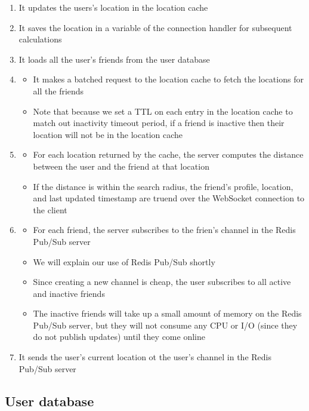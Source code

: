 \documentclass{report}
\theoremstyle{definition}
\let\oldsubsection\subsection
\renewcommand{\subsection}{\oldsubsection*}
\begin{document}
\begin{enumerate}
\item
It updates the users's location in the location cache
\item
It saves the location in a variable of the connection handler for subsequent calculations
\item
It loads all the user's friends from the user database
\item

\begin{itemize}
\item
It makes a batched request to the location cache to fetch the locations for all the friends
\item
Note that because we set a TTL on each entry in the location cache to match out inactivity timeout period, if a friend is inactive then their location will not be in the location cache
\end{itemize}
\item
\begin{itemize}
\item
For each location returned by the cache, the server computes the distance between the user and the friend at that location
\item
If the distance is within the search radius, the friend's profile, location, and last updated timestamp are truend over the WebSocket
connection to the client
\end{itemize}
\item

\begin{itemize}
\item
For each friend, the server subscribes to the frien's channel in the Redis Pub/Sub server
\item
We will explain our use of Redis Pub/Sub shortly
\item
Since creating a new channel is cheap, the user subscribes to all active and inactive friends
\item
The inactive friends will take up a small amount of memory on the Redis Pub/Sub server, but they will not consume any CPU or I/O (since they do not publish updates) until they come online
\end{itemize}
\item
It sends the user's current location ot the user's channel in the Redis Pub/Sub server
\end{enumerate}

\subsection{User database}
\end{document}
